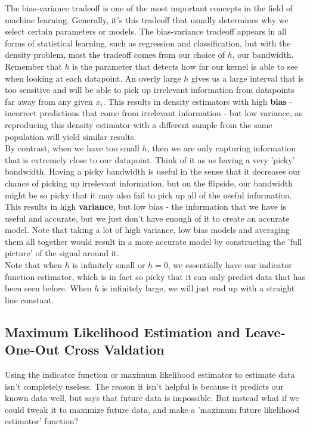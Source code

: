 \documentclass[12pt]{article}
\begin{document}
The bias-variance tradeoff is one of the most important concepts in the field of machine learning. Generally, it's this tradeoff that usually determines why we select certain parameters or models. The bias-variance tradeoff appears in all forms of statistical learning, such as regression and classification, but with the density problem, most the tradeoff comes from our choice of $h$, our bandwidth. \\

Remember that $h$ is the parameter that detects how far our kernel is able to see when looking at each datapoint. An overly large $h$ gives us a large interval that is too sensitive and will be able to pick up irrelevant information from datapoints far away from any given $x_i$. This results in density estimators with high \textbf{bias} - incorrect predictions that come from irrelevant information - but low variance, as reproducing this density estimator with a different sample from the same population will yield similar results. \\

By contrast, when we have too small $h$, then we are only capturing information that is extremely close to our datapoint. Think of it as us having a very 'picky' bandwidth. Having a picky bandwidth is useful in the sense that it decreases our chance of picking up irrelevant information, but on the flipside, our bandwidth might be so picky that it may also fail to pick up all of the useful information. This results in high \textbf{variance}, but low bias - the information that we have is useful and accurate, but we just don't have enough of it to create an accurate model. Note that taking a lot of high variance, low bias models and averaging them all together would result in a more accurate model by constructing the 'full picture' of the signal around it. \\

Note that when $h$ is infinitely small or $h = 0$, we essentially have our indicator function estimator, which is in fact so picky that it can only predict data that has been seen before. When $h$ is infinitely large, we will just end up with a straight line constant.


\subsection{Maximum Likelihood Estimation and Leave-One-Out Cross Valdation}

Using the indicator function or maximum likelihood estimator to estimate data isn't completely useless. The reason it isn't helpful is because it predicts our known data well, but says that future data is impossible. But instead what if we could tweak it to maximize future data, and make a 'maximum future likelihood estimator' function?
\end{document}
